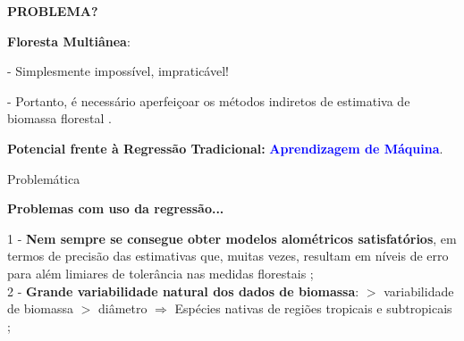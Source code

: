 \documentclass[12pt,ignorenonframetext,aspectratio=1610]{beamer}
\begin{document}
\begin{frame}[t]{}
	
	\textbf{PROBLEMA?} \newline
	
\textbf{Floresta Multiânea}: \newline

- Simplesmente impossível, impraticável!  \newline

- Portanto, é necessário aperfeiçoar os métodos indiretos de estimativa de biomassa florestal \cite{higuchi2004dinamica}. \newline

\textbf{Potencial frente à Regressão Tradicional:} \textcolor{blue}{\textbf{Aprendizagem de Máquina}}. \newline

\end{frame}

\begin{frame}[c]{Problemática}
	
	\transwipe
	\justifying
	
	\textbf{Problemas com uso da regressão... } \newline
	
	\begin{infobox}
			
1 - \textbf{Nem sempre se consegue obter modelos alométricos satisfatórios}, em termos de precisão das estimativas que, muitas vezes, resultam em níveis de erro para além limiares de tolerância nas medidas florestais \cite{sanquetta2013use}; \\

2 - \textbf{Grande variabilidade natural dos dados de biomassa}: $>$ variabilidade de biomassa $>$ diâmetro $\Longrightarrow$ Espécies nativas de regiões tropicais e subtropicais \cite{sanquetta2015comparison};
		
	\end{infobox}
	
\end{frame}
\end{document}
